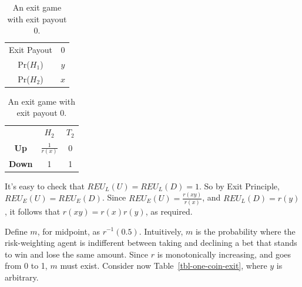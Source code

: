 \documentclass[
  12pt,
  letterpaper,
  DIV=11,
  numbers=noendperiod]{scrreprt}
\begin{document}
\begin{table}

\caption{\label{tbl-zero-coin-exit}An exit game with exit payout
0.}\begin{minipage}[t]{0.50\linewidth}

{\centering 

\begin{tabular}[t]{cc}
\toprule
Exit Payout & 0\\
Pr(\(H_1\)) & \(y\)\\
Pr(\(H_2\)) & \(x\)\\
\bottomrule
\end{tabular}

}

\end{minipage}%
%
\begin{minipage}[t]{0.50\linewidth}

{\centering 

\begin{tabular}[t]{ccc}
\toprule
 & \(H_2\) & \(T_2\)\\
\textbf{Up} & \(\frac{1}{r(x)}\) & 0\\
\textbf{Down} & 1 & 1\\
\bottomrule
\end{tabular}

}

\end{minipage}%

\end{table}

It's easy to check that \(REU_L(U) = REU_L(D) = 1\). So by Exit
Principle, \(REU_E(U) = REU_E(D)\). Since
\(REU_E(U) = \frac{r(xy)}{r(x)}\), and \(REU_L(D) = r(y)\), it follows
that \(r(xy) = r(x)r(y)\), as required.

Define \(m\), for midpoint, as \(r^{-1}(0.5)\). Intuitively, \(m\) is
the probability where the risk-weighting agent is indifferent between
taking and declining a bet that stands to win and lose the same amount.
Since \(r\) is monotonically increasing, and goes from 0 to 1, \(m\)
must exist. Consider now Table~\ref{tbl-one-coin-exit}, where \(y\) is
arbitrary.
\end{document}
